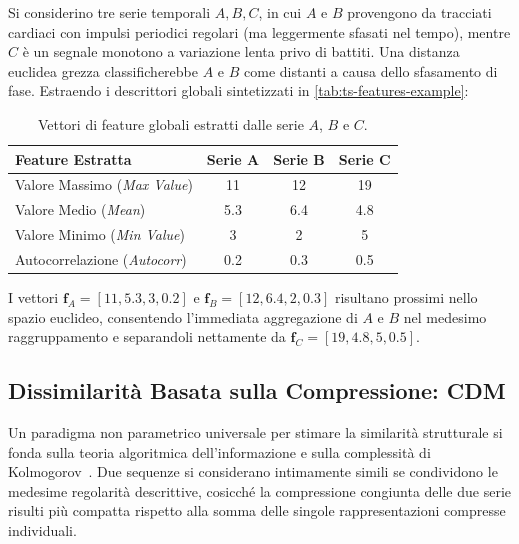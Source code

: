 \begin{example}
\label{ex:feature-separation}
Si considerino tre serie temporali $A, B, C$, in cui $A$ e $B$ provengono da tracciati cardiaci con impulsi periodici regolari (ma leggermente sfasati nel tempo), mentre $C$ \`e un segnale monotono a variazione lenta privo di battiti. Una distanza euclidea grezza classificherebbe $A$ e $B$ come distanti a causa dello sfasamento di fase. Estraendo i descrittori globali sintetizzati in \autoref{tab:ts-features-example}:
\begin{table}[H]
\centering
\small
\renewcommand{\arraystretch}{1.2}
\begin{tabular}{l c c c}
\toprule
\textbf{Feature Estratta} & \textbf{Serie A} & \textbf{Serie B} & \textbf{Serie C} \\
\midrule
Valore Massimo (\textit{Max Value}) & 11  & 12  & 19  \\
Valore Medio (\textit{Mean})         & 5.3 & 6.4 & 4.8 \\
Valore Minimo (\textit{Min Value})  & 3   & 2   & 5   \\
Autocorrelazione (\textit{Autocorr}) & 0.2 & 0.3 & 0.5 \\
\bottomrule
\end{tabular}
\caption{Vettori di feature globali estratti dalle serie $A$, $B$ e $C$.}
\label{tab:ts-features-example}
\end{table}
I vettori $\mathbf{f}_A = [11, 5.3, 3, 0.2]$ e $\mathbf{f}_B = [12, 6.4, 2, 0.3]$ risultano prossimi nello spazio euclideo, consentendo l'immediata aggregazione di $A$ e $B$ nel medesimo raggruppamento e separandoli nettamente da $\mathbf{f}_C = [19, 4.8, 5, 0.5]$.
\end{example}

\FloatBarrier
\subsection{Dissimilarit\`a Basata sulla Compressione: CDM}
\label{subsec:ts-compression-cdm}

Un paradigma non parametrico universale per stimare la similarit\`a strutturale si fonda sulla teoria algoritmica dell'informazione e sulla complessit\`a di Kolmogorov~\cite{keogh2004}. Due sequenze si considerano intimamente simili se condividono le medesime regolarit\`a descrittive, cosicch\'e la compressione congiunta delle due serie risulti pi\`u compatta rispetto alla somma delle singole rappresentazioni compresse individuali.


